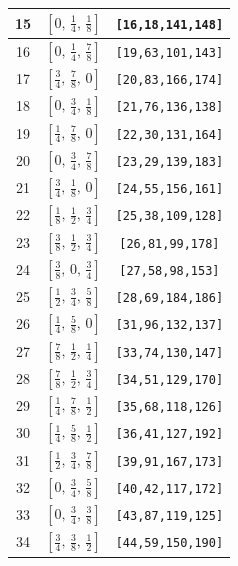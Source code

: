 \documentclass[fleqn,8pt]{jsarticle}
\begin{document}
\begin{longtable}{ccc}
15 & $\left[ 0,\, \frac{1}{4},\, \frac{1}{8} \right]$ & {\tt [16,18,141,148]} \\ \hline
16 & $\left[ 0,\, \frac{1}{4},\, \frac{7}{8} \right]$ & {\tt [19,63,101,143]} \\ \hline
17 & $\left[ \frac{3}{4},\, \frac{7}{8},\, 0 \right]$ & {\tt [20,83,166,174]} \\ \hline
18 & $\left[ 0,\, \frac{3}{4},\, \frac{1}{8} \right]$ & {\tt [21,76,136,138]} \\ \hline
19 & $\left[ \frac{1}{4},\, \frac{7}{8},\, 0 \right]$ & {\tt [22,30,131,164]} \\ \hline
20 & $\left[ 0,\, \frac{3}{4},\, \frac{7}{8} \right]$ & {\tt [23,29,139,183]} \\ \hline
21 & $\left[ \frac{3}{4},\, \frac{1}{8},\, 0 \right]$ & {\tt [24,55,156,161]} \\ \hline
22 & $\left[ \frac{1}{8},\, \frac{1}{2},\, \frac{3}{4} \right]$ & {\tt [25,38,109,128]} \\ \hline
23 & $\left[ \frac{3}{8},\, \frac{1}{2},\, \frac{3}{4} \right]$ & {\tt [26,81,99,178]} \\ \hline
24 & $\left[ \frac{3}{8},\, 0,\, \frac{3}{4} \right]$ & {\tt [27,58,98,153]} \\ \hline
25 & $\left[ \frac{1}{2},\, \frac{3}{4},\, \frac{5}{8} \right]$ & {\tt [28,69,184,186]} \\ \hline
26 & $\left[ \frac{1}{4},\, \frac{5}{8},\, 0 \right]$ & {\tt [31,96,132,137]} \\ \hline
27 & $\left[ \frac{7}{8},\, \frac{1}{2},\, \frac{1}{4} \right]$ & {\tt [33,74,130,147]} \\ \hline
28 & $\left[ \frac{7}{8},\, \frac{1}{2},\, \frac{3}{4} \right]$ & {\tt [34,51,129,170]} \\ \hline
29 & $\left[ \frac{1}{4},\, \frac{7}{8},\, \frac{1}{2} \right]$ & {\tt [35,68,118,126]} \\ \hline
30 & $\left[ \frac{1}{4},\, \frac{5}{8},\, \frac{1}{2} \right]$ & {\tt [36,41,127,192]} \\ \hline
31 & $\left[ \frac{1}{2},\, \frac{3}{4},\, \frac{7}{8} \right]$ & {\tt [39,91,167,173]} \\ \hline
32 & $\left[ 0,\, \frac{3}{4},\, \frac{5}{8} \right]$ & {\tt [40,42,117,172]} \\ \hline
33 & $\left[ 0,\, \frac{3}{4},\, \frac{3}{8} \right]$ & {\tt [43,87,119,125]} \\ \hline
34 & $\left[ \frac{3}{4},\, \frac{3}{8},\, \frac{1}{2} \right]$ & {\tt [44,59,150,190]} \\ \hline

\end{longtable}
\end{document}
